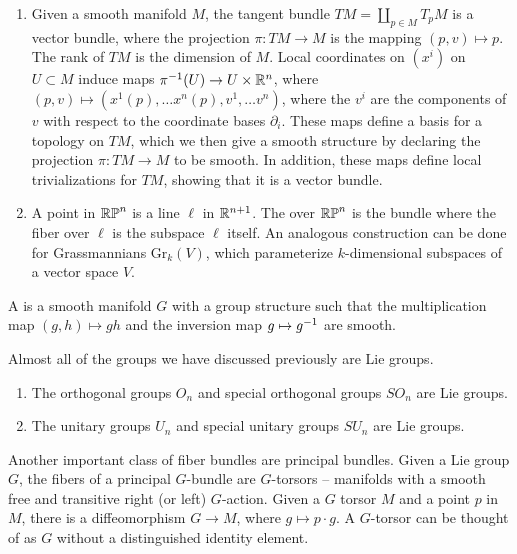 \begin{exmp} \enumbreak
\begin{enumerate}
\item Given a smooth manifold $M$, the tangent bundle $TM = \coprod_{p \in M} T_pM$
is a vector bundle, where the projection $\pi : TM \to M$ is the mapping
$(p,v) \mapsto p$. The rank of $TM$ is the dimension of $M$.
Local coordinates on $(x^i)$ on $U \subset M$ induce maps
$\pi^{-1}(U) \to U \times \mathbb{R}^n$, where
$(p,v) \mapsto (x^1(p), \ldots x^n(p), v^1, \ldots v^n)$, where the $v^i$ are
the components of $v$ with respect to the coordinate bases $\partial_i$.
These maps define a basis for a topology on $TM$, which we then give
a smooth structure by declaring the projection $\pi : TM \to M$ to be
smooth. In addition, these maps define local trivializations for $TM$,
showing that it is a vector bundle.
\item A point in $\mathbb{RP}^n$ is a line $\ell$ in $\mathbb{R}^{n+1}$. The  over $\mathbb{RP}^n$ is the bundle where the fiber over $\ell$ is the subspace
$\ell$ itself. An analogous construction can be done for Grassmannians
$\mathrm{Gr}_k(V)$, which parameterize $k$-dimensional subspaces of
a vector space $V$.
\qedhere\end{enumerate}
\end{exmp}
%
\begin{defn}
A  is a smooth manifold $G$ with a group structure such that the
multiplication map $(g,h) \mapsto gh$ and the inversion map $g \mapsto g^{-1}$
are smooth.
\end{defn}
%
Almost all of the groups we have discussed previously are Lie groups.
\begin{exmp} \enumbreak
\begin{enumerate}
\item The orthogonal groups $O_n$ and special orthogonal groups $SO_n$ are Lie groups.
\item The unitary groups $U_n$ and special unitary groups $SU_n$ are Lie groups.
\qedhere\end{enumerate}
\end{exmp}
%
Another important class of fiber bundles are principal bundles. Given a
Lie group $G$, the fibers of a principal $G$-bundle are $G$-torsors --
manifolds with a smooth free and transitive right (or left) $G$-action.
Given a $G$ torsor $M$ and a point $p$ in $M$, there is a diffeomorphism
$G \to M$, where $g \mapsto p \cdot g$. A $G$-torsor can be thought
of as $G$ without a distinguished identity element.
%
